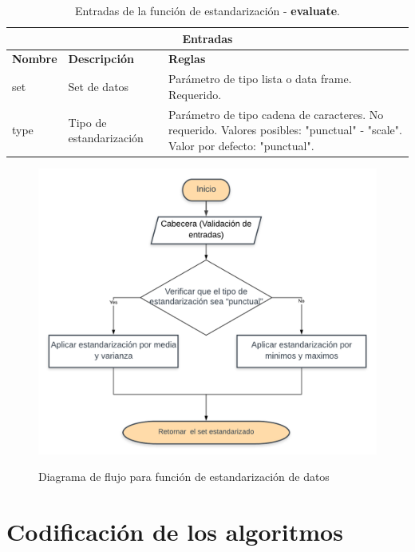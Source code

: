 \begin{table}[htb]
\begin{center}
\begin{tabular}{|p{3cm}|p{5cm}|p{8cm}|}
\hline
\multicolumn{3}{|c|}{\textbf{Entradas}} \\
\hline
\textbf{Nombre} & \textbf{Descripción} & \textbf{Reglas} \\
\hline \hline
set & Set de datos & Parámetro de tipo lista o data frame. Requerido. \\ \hline
type & Tipo de estandarización & Parámetro de tipo cadena de caracteres. No requerido. Valores posibles: "punctual" - "scale". Valor por defecto: "punctual".\\ \hline
\end{tabular}
\caption{Entradas de la función de estandarización - \textbf{evaluate}.}
\label{tabla:entradasStandardize}
\end{center}
\end{table}

\begin{figure}[h]
	\caption{Diagrama de flujo para función de  estandarización de datos}
	\centering
	\includegraphics[scale=0.5]{standardize.png}
	\label{fig:standardize}
\end{figure}

\section{Codificación de los algoritmos}

